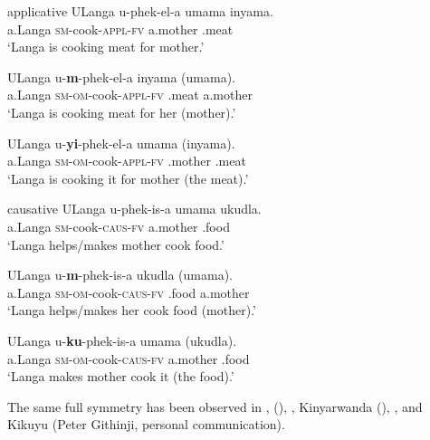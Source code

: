 \documentclass[output=paper]{LSP/langsci}
\begin{document}
\newpage 
 \ea\label{ex:vanderwal:7}
  {applicative}
  \ea\label{ex:vanderwal:7a}
\gll ULanga  u-phek-el-a  umama  inyama. \\
    a.Langa  \textsc{sm}{}-cook-\textsc{appl}{}-\textsc{fv}  a.mother  .meat\\
    \glt ‘Langa is cooking meat for mother.’

 \ex\label{ex:vanderwal:7b}
\gll ULanga  u-\textbf{m}{}-phek-el-a  inyama  (umama). \\
    a.Langa  \textsc{sm-om}-cook-\textsc{appl}{}-\textsc{fv}  .meat  a.mother \\
    \glt ‘Langa is cooking meat for her (mother).’

 \ex\label{ex:vanderwal:7c}
\gll ULanga  u-\textbf{yi}{}-phek-el-a  umama  (inyama). \\
    a.Langa  \textsc{sm-om}{}-cook-\textsc{appl}{}-\textsc{fv}  .mother  .meat \\
    \glt ‘Langa is cooking it for mother (the meat).’
\z
\z

 \ea\label{ex:vanderwal:8}
      {causative}
      \ea\label{ex:vanderwal:8a}
\gll ULanga  u-phek-is-a  umama  ukudla. \\
    a.Langa  \textsc{sm}{}-cook-\textsc{caus}{}-\textsc{fv}  a.mother  .food \\
    \glt ‘Langa helps/makes mother cook food.’


 \ex\label{ex:vanderwal:8b}
\gll ULanga  u-\textbf{m}{}-phek-is-a  ukudla  (umama). \\
    a.Langa  \textsc{sm-om}{}-cook-\textsc{caus-fv}  .food  a.mother \\
    \glt ‘Langa helps/makes her cook food (mother).’

 \ex\label{ex:vanderwal:8c}
\gll ULanga  u-\textbf{ku}{}-phek-is-a  umama  (ukudla). \\
    a.Langa  \textsc{sm-om}{}-cook-\textsc{caus-fv}  a.mother  .food \\
    \glt ‘Langa makes mother cook it (the food).’
\z
\z

The same full symmetry has been observed in  \citep{Hodges1977}, 
 (\citealt{Mugari2013,MathangwaneOsam2006}), 
 \citep{BakerEtAl2012}, 
Kinyarwanda (\citealt{ZellerNgoboka2014,Ngoboka2005}), 
 \citep{Muriungi2008}, 
and Kikuyu (Peter Githinji, personal communication).
\end{document}
